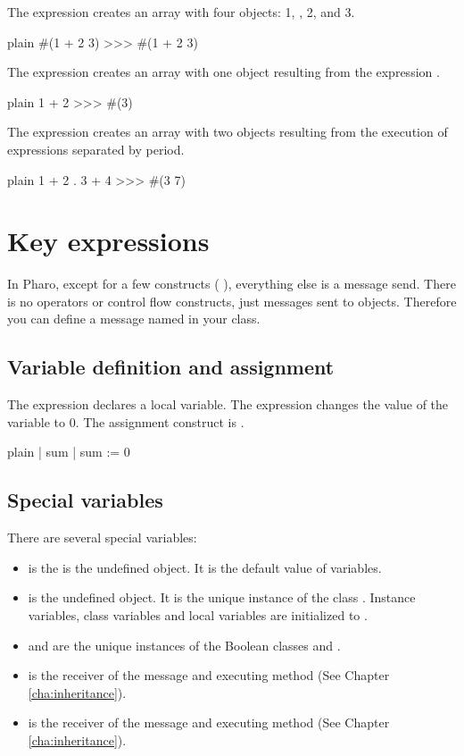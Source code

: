 \documentclass[10pt,twoside,english]{_support/latex/sbabook/sbabook}
\begin{document}
The expression  creates an array with four objects: 1, \textcode{\#+}, 2, and 3. 

\begin{displaycode}{plain}
#(1 + 2 3)
>>> #(1 + 2 3)
\end{displaycode}

The expression  creates an array with one object resulting from the expression .

\begin{displaycode}{plain}
{ 1 + 2}
>>> #(3)
\end{displaycode}

The expression  creates an array with two objects resulting from the execution of expressions separated by period.

\begin{displaycode}{plain}
{ 1 + 2 . 3 + 4}
>>> #(3 7)
\end{displaycode}
\section{Key expressions}
In Pharo, except for a few constructs ( ), everything else is a message send.
There is no operators or control flow constructs,  just messages sent to objects. Therefore you can 
define a message named \textcode{+} in your class. 
\subsection{Variable definition and assignment}
The expression  declares a local variable. The expression  changes the value of the variable  to 0. The assignment construct is \textcode{:=}.

\begin{displaycode}{plain}
| sum |
sum := 0
\end{displaycode}
\subsection{Special variables}
There are several special variables:

\begin{itemize}
\item {} is the is the undefined object. It is the default value of variables. 
\item {} is the undefined object. It is the unique instance of the class . Instance variables, class variables and local variables are initialized to .
\item {} and  are the unique instances of the Boolean classes  and . 
\item {} is the receiver of the message and executing method (See Chapter \ref{cha:inheritance}).
\item {} is the receiver of the message and executing method  (See Chapter \ref{cha:inheritance}).
\end{itemize}
\end{document}
